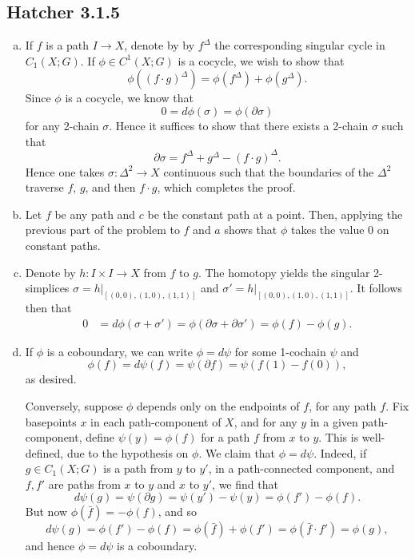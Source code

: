 \documentclass{../mathnotes}
\begin{document}
\subsection*{Hatcher 3.1.5}
\begin{enumerate}[(a)]
    \item If $f$ is a path $I\to X$, denote by by $f^\Delta$ the corresponding singular cycle
        in $C_1(X;G)$. If $\phi\in C^1(X;G)$ is a cocycle, we wish to show that
        \[\phi\left( (f\cdot g)^\Delta \right)=\phi(f^\Delta)+\phi(g^\Delta).\]
        Since $\phi$ is a cocycle, we know that
        \[0=d\phi(\sigma)=\phi(\partial\sigma)\]
        for any 2-chain $\sigma$. Hence it suffices to show that there exists
        a 2-chain $\sigma$ such that
        \[\partial\sigma=f^\Delta+g^\Delta-(f\cdot g)^\Delta.\]
        Hence one takes $\sigma:\Delta^2\to X$ continuous such that the boundaries
        of the $\Delta^2$ traverse $f$, $g$, and then $f\cdot g$, which completes
        the proof.
    \item Let $f$ be any path and $c$ be the constant path at a point. Then, applying
        the previous part of the problem to $f$ and $a$ shows that $\phi$ takes the
        value 0 on constant paths.
    \item Denote by $h:I\times I\to X$ from $f$ to $g$. The homotopy yields the singular 2-simplices
        $\sigma=h|_{[(0,0),(1,0),(1,1)]}$ and $\sigma'=h|_{[(0,0),(1,0),(1,1)]}$. It
        follows then that
        \begin{align*}
            0&=d\phi(\sigma+\sigma')=\phi(\partial\sigma+\partial\sigma')=\phi(f)-\phi(g).
        \end{align*}
    \item If $\phi$ is a coboundary, we can write $\phi=d\psi$ for some 1-cochain $\psi$ and
        \[\phi(f)=d\psi(f)=\psi(\partial f)=\psi\left( f(1)-f(0) \right),\]
        as desired.

        Conversely, suppose $\phi$ depends only on the endpoints of $f$, for any path $f$.
        Fix basepoints $x$ in each path-component of $X$, and for any $y$ in a given
        path-component, define $\psi(y)=\phi(f)$ for a path $f$ from $x$ to $y$. This
        is well-defined, due to the hypothesis on $\phi$. We claim that $\phi=d\psi$.
        Indeed, if $g\in C_1(X;G)$ is a path from $y$ to $y'$, in a path-connected component,
        and $f,f'$ are paths from $x$ to $y$ and $x$ to $y'$, we find that
        \[d\psi(g)=\psi(\partial g)=\psi(y')-\psi(y)=\phi(f')-\phi(f).\]
        But now $\phi(\bar f)=-\phi(f)$, and so
        \[d\psi(g)=\phi(f')-\phi(f)=\phi(\bar f)+\phi(f')=\phi(\bar f\cdot f')=\phi(g),\]
        and hence $\phi=d\psi$ is a coboundary.
\end{enumerate}
\end{document}
